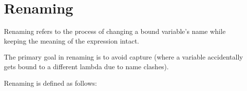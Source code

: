 \documentclass{lecturenotes}
\begin{document}
\section{Renaming}
Renaming refers to the process of changing a bound variable's name while keeping the meaning of the expression intact. 

\noindent The primary goal in renaming is to avoid capture (where a variable accidentally gets bound to a different lambda due to name clashes).

\noindent Renaming is defined as follows:

\begin{code}%
\>[0]\AgdaSpace{}%
\AgdaSymbol{:}\AgdaSpace{}%
\<%
\\
\>[0]\AgdaSpace{}%
\AgdaSymbol{=}\AgdaSpace{}%
\AgdaSpace{}%
\AgdaSpace{}%
\<%
\\
%
\\[\AgdaEmptyExtraSkip]%
\>[0]\AgdaSpace{}%
\AgdaSymbol{:}\AgdaSpace{}%
\AgdaSpace{}%
\AgdaSpace{}%
\<%
\\
\>[0]\AgdaSpace{}%
\AgdaSpace{}%
\AgdaSpace{}%
\AgdaSymbol{=}\AgdaSpace{}%
\<%
\\
\>[0]\AgdaSpace{}%
\AgdaSpace{}%
\AgdaSymbol{(}\AgdaSpace{}%
\AgdaSymbol{)}\AgdaSpace{}%
\AgdaSymbol{=}\AgdaSpace{}%
\AgdaSymbol{(}\AgdaSpace{}%
\AgdaSymbol{)}\<%
\\
%
\\[\AgdaEmptyExtraSkip]%
\>[0]\AgdaSpace{}%
\AgdaSymbol{:}\AgdaSpace{}%
\AgdaSpace{}%
\AgdaSpace{}%
\AgdaSpace{}%
\AgdaSpace{}%
\<%
\\
\>[0]\AgdaSymbol{(}\AgdaSpace{}%
\AgdaSymbol{)}\AgdaSpace{}%
\AgdaSpace{}%
\AgdaSpace{}%
\AgdaSpace{}%
\AgdaSymbol{=}\AgdaSpace{}%
\AgdaSpace{}%
\AgdaSymbol{(}\AgdaSpace{}%
\AgdaSymbol{)}\<%
\\

\end{code}
\end{document}
